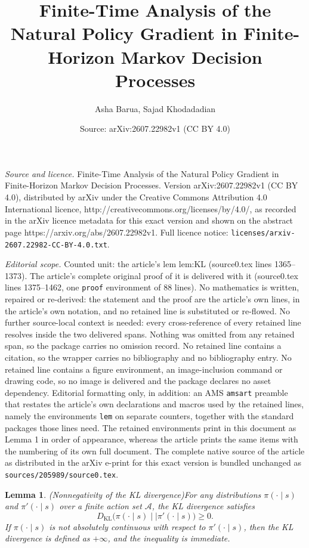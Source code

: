 \documentclass[10pt,a4paper]{amsart}
\title{Finite-Time Analysis of the Natural Policy Gradient in Finite-Horizon Markov Decision Processes}
\author{Asha Barua, Sajad Khodadadian}
\date{Source: arXiv:2607.22982v1 (CC BY 4.0)}
\newtheorem{lem}{Lemma}
\begin{document}
\maketitle

\noindent\emph{Source and licence.} Finite-Time Analysis of the Natural Policy Gradient in Finite-Horizon Markov Decision Processes. Version arXiv:2607.22982v1 (CC BY 4.0), distributed by arXiv under the Creative Commons Attribution 4.0 International licence, http://creativecommons.org/licenses/by/4.0/, as recorded in the arXiv licence metadata for this exact version and shown on the abstract page https://arxiv.org/abs/2607.22982v1. Full licence notice: \texttt{licenses/arxiv-2607.22982-CC-BY-4.0.txt}.\par\smallskip

\noindent\textit{Editorial scope.} Counted unit: the article's lem lem:KL (source0.tex lines 1365--1373). The article's complete original proof of it is delivered with it (source0.tex lines 1375--1462, one \texttt{proof} environment of 88 lines). No mathematics is written, repaired or re-derived: the statement and the proof are the article's own lines, in the article's own notation, and no retained line is substituted or re-flowed.  No further source-local context is needed: every cross-reference of every retained line resolves inside the two delivered spans.  Nothing was omitted from any retained span, so the package carries no omission record.  No retained line contains a citation, so the wrapper carries no bibliography and no bibliography entry.  No retained line contains a figure environment, an image-inclusion command or drawing code, so no image is delivered and the package declares no asset dependency.  Editorial formatting only, in addition: an AMS \texttt{amsart} preamble that restates the article's own declarations and macros used by the retained lines, namely the environments \texttt{lem} on separate counters, together with the standard packages those lines need.  The retained environments print in this document as Lemma 1 in order of appearance, whereas the article prints the same items with the numbering of its own full document.  The complete native source of the article as distributed in the arXiv e-print for this exact version is bundled unchanged as \texttt{sources/205989/source0.tex}.
\begin{lem}{(Nonnegativity of the KL divergence)}\label{lem:KL}
For any distributions $\pi(\cdot\mid s)$ and $\pi'(\cdot\mid s)$ over a finite action set
$\mathcal A$, the KL divergence satisfies
\[
D_{\mathrm{KL}}\big(\pi(\cdot\mid s)\mid\mid\pi'(\cdot\mid s)\big)\ge 0.
\]
If $\pi(\cdot\mid s)$ is not absolutely continuous with respect to $\pi'(\cdot\mid s)$, then
the KL divergence is defined as $+\infty$, and the inequality is immediate.
\end{lem}
\end{document}
